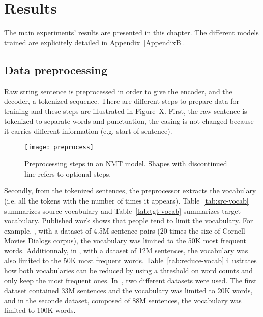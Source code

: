 
\chapter{Results} %
\label{Chapter4} %

The main experiments' results are presented in this chapter. The different models trained are explicitely detailed in Appendix~\ref{AppendixB}.

\section{Data preprocessing}
Raw string sentence is preprocessed in order to give the encoder, and the decoder, a tokenized sequence. There are different steps to prepare data for training and these steps are illustrated in Figure~X. First, the raw sentence is tokenized to separate words and punctuation, the casing is not changed because it carries different information (e.g. start of sentence).

\begin{figure}
    \centering
    \texttt{[image: preprocess]}
    \decoRule
    \caption[Preprocessing steps in NMT]{Preprocessing steps in an NMT model. Shapes with discontinued line refers to optional steps.}
    \label{fig:preprocess}
\end{figure}

Secondly, from the tokenized sentences, the preprocessor extracts the vocabulary (i.e. all the tokens with the number of times it appears). Table~\ref{tab:src-vocab} summarizes source vocabulary and Table~\ref{tab:tgt-vocab} summarizes target vocabulary.
Published work shows that people tend to limit the vocabulary. For example, \citet{1508.04025}, with a dataset of 4.5M sentence pairs (20 times the size of Cornell Movies Dialogs corpus), the vocabulary was limited to the 50K most frequent words. Additionnaly, in \citet{1506.06714}, with a dataset of 12M sentences, the vocabulary was also limited to the 50K most frequent words.
Table~\ref{tab:reduce-vocab} illustrates how both vocabularies can be reduced by using a threshold on word counts and only keep the most frequent ones.
In~\citet{1506.05869}, two different datasets were used. The first dataset contained 33M sentences and the vocabulary was limited to 20K words, and in the seconde dataset, composed of 88M sentences, the vocabulary was limited to 100K words.


